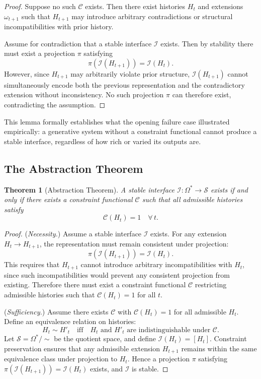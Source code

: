 \documentclass[12pt, a4paper]{article}
\theoremstyle{plain}
\newtheorem{theorem}{Theorem}[section]
\theoremstyle{definition}
\theoremstyle{remark}
\begin{document}
\begin{proof}
Suppose no such $\mathcal{C}$ exists. Then there exist histories $H_t$ and extensions $\omega_{t+1}$ such that $H_{t+1}$ may introduce arbitrary contradictions or structural incompatibilities with prior history.

Assume for contradiction that a stable interface $\mathcal{I}$ exists. Then by stability there must exist a projection $\pi$ satisfying
\[
\pi(\mathcal{I}(H_{t+1})) = \mathcal{I}(H_t).
\]
However, since $H_{t+1}$ may arbitrarily violate prior structure, $\mathcal{I}(H_{t+1})$ cannot simultaneously encode both the previous representation and the contradictory extension without inconsistency. No such projection $\pi$ can therefore exist, contradicting the assumption.
\end{proof}

This lemma formally establishes what the opening failure case illustrated empirically: a generative system without a constraint functional cannot produce a stable interface, regardless of how rich or varied its outputs are.

\subsection{The Abstraction Theorem}

\begin{theorem}[Abstraction Theorem]
\label{thm:abstraction}
A stable interface $\mathcal{I} : \Omega^* \to \mathcal{S}$ exists if and only if there exists a constraint functional $\mathcal{C}$ such that all admissible histories satisfy
\[
\mathcal{C}(H_t) = 1 \quad \forall\, t.
\]
\end{theorem}

\begin{proof}
(\textit{Necessity.}) Assume a stable interface $\mathcal{I}$ exists. For any extension $H_t \to H_{t+1}$, the representation must remain consistent under projection:
\[
\pi(\mathcal{I}(H_{t+1})) = \mathcal{I}(H_t).
\]
This requires that $H_{t+1}$ cannot introduce arbitrary incompatibilities with $H_t$, since such incompatibilities would prevent any consistent projection from existing. Therefore there must exist a constraint functional $\mathcal{C}$ restricting admissible histories such that $\mathcal{C}(H_t) = 1$ for all $t$.

(\textit{Sufficiency.}) Assume there exists $\mathcal{C}$ with $\mathcal{C}(H_t) = 1$ for all admissible $H_t$. Define an equivalence relation on histories:
\[
H_t \sim H'_t \quad \text{iff} \quad H_t \text{ and } H'_t \text{ are indistinguishable under } \mathcal{C}.
\]
Let $\mathcal{S} = \Omega^* / {\sim}$ be the quotient space, and define $\mathcal{I}(H_t) = [H_t]$. Constraint preservation ensures that any admissible extension $H_{t+1}$ remains within the same equivalence class under projection to $H_t$. Hence a projection $\pi$ satisfying $\pi(\mathcal{I}(H_{t+1})) = \mathcal{I}(H_t)$ exists, and $\mathcal{I}$ is stable.
\end{proof}
\end{document}
